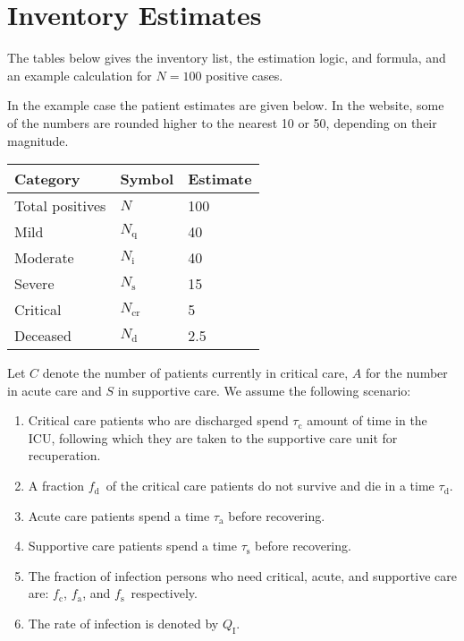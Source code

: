\documentclass{article}
\newcommand{\nd}{\ensuremath{N_{\mathrm{d}}}}
\newcommand{\ncr}{\ensuremath{N_{\mathrm{cr}}}}
\newcommand{\ns}{\ensuremath{N_{\mathrm{s}}}}
\newcommand{\nin}{\ensuremath{N_{\mathrm{i}}}}
\newcommand{\nq}{\ensuremath{N_{\mathrm{q}}}}
\newcommand{\fd}{\ensuremath{f_{\mathrm{d}}}}
\newcommand{\fc}{\ensuremath{f_{\mathrm{c}}}}
\newcommand{\fa}{\ensuremath{f_{\mathrm{a}}}}
\newcommand{\fs}{\ensuremath{f_{\mathrm{s}}}}
\newcommand{\taud}{\ensuremath{\tau_{\mathrm{d}}}}
\newcommand{\tauc}{\ensuremath{\tau_{\mathrm{c}}}}
\newcommand{\taua}{\ensuremath{\tau_{\mathrm{a}}}}
\newcommand{\taus}{\ensuremath{\tau_{\mathrm{s}}}}
\newcommand{\Qi}{\ensuremath{Q_{\mathrm{I}}}}
\begin{document}
\section{Inventory Estimates}
The tables below gives the inventory list, the estimation logic, and
formula, and an example calculation for $N=100$ positive cases.

In the example case the patient estimates are given below. In the
website, some of the numbers are rounded higher to the nearest 10 or
50, depending on their magnitude.

\noindent
\begin{tabular}{lll}
  \toprule
  Category & Symbol & Estimate \\
  \midrule
  Total positives & $N$ & 100 \\
  Mild & $\nq$ & 40 \\
  Moderate & $\nin$ & 40 \\
  Severe & $\ns$ & 15 \\
  Critical & $\ncr$ & 5\\
  Deceased & $\nd$ & 2.5\\
  \bottomrule
\end{tabular}

Let $C$ denote the number of patients currently in critical care, $A$
for the number in acute care and $S$ in supportive care.  We assume
the following scenario:
\begin{enumerate}
\item Critical care patients who are discharged spend $\tauc$ amount
  of time in the ICU, following which they are taken to the supportive
  care unit for recuperation.
\item A fraction \fd\ of the critical care patients do not survive and
  die in a time $\taud$.
\item Acute care patients spend a time $\taua$ before recovering.
  
\item Supportive care patients spend a time $\taus$ before recovering.

\item The fraction of infection persons who need critical, acute, and
  supportive care are: \fc, \fa, and \fs\ respectively.

\item The rate of infection is denoted by \Qi.
 
\end{enumerate}
\end{document}

